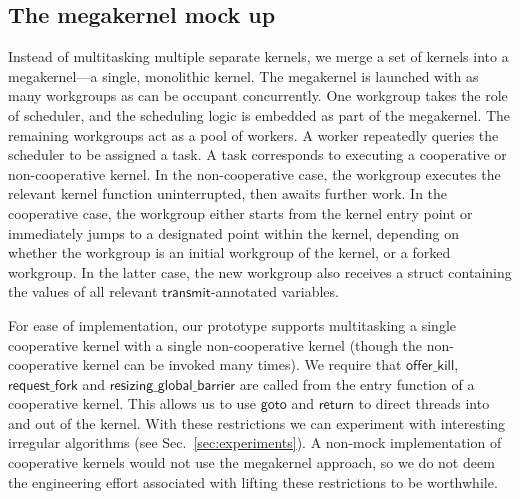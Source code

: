 \documentclass[parskip=half,sigconf,review, anonymous=true, acmcopyrightmode=none]{acmart}
\newcommand{\kernelmerge}{\textsc{KernelMerge}}
\newcommand{\mysec}{Sec.~}
\newcommand{\transmit}{\mathsf{transmit}}
\newcommand{\offerfork}{\mathsf{request\_fork}}
\newcommand{\offerkill}{\mathsf{offer\_kill}}
\newcommand{\resizingglobalbarrier}{\mathsf{resizing\_global\_barrier}}
\newcommand{\keyword}[1]{\mathsf{#1}}
\begin{document}
\subsection{The megakernel mock up}\label{sec:megakernel}

Instead of multitasking multiple separate kernels, we merge a set of
kernels into a megakernel---a single, monolithic kernel.  The
megakernel is launched with as many workgroups as can be occupant
concurrently.  One workgroup takes the role of scheduler, and the
scheduling logic is embedded as part of the megakernel.  The remaining
workgroups act as a pool of workers.  A worker repeatedly queries the
scheduler to be assigned a task.  A task corresponds to executing a
cooperative or non-cooperative kernel.  In the non-cooperative case,
the workgroup executes the relevant kernel function uninterrupted,
then awaits further work.  In the cooperative case, the workgroup
either starts from the kernel entry point or immediately jumps to a
designated point within the kernel, depending on whether the workgroup
is an initial workgroup of the kernel, or a forked workgroup.  In the
latter case, the new workgroup also receives a struct containing the
values of all relevant $\transmit$-annotated variables.

%
For ease of implementation, our prototype supports multitasking a
single cooperative kernel with a single non-cooperative kernel (though
the non-cooperative kernel can be invoked many times).  
We require that $\offerkill$, $\offerfork$ and
$\resizingglobalbarrier$ are called from the entry function of a
cooperative kernel.  This allows us to use $\keyword{goto}$ and
$\keyword{return}$ to direct threads into and out of the kernel.  With
these restrictions we can experiment with interesting irregular
algorithms (see \mysec\ref{sec:experiments}).  A non-mock
implementation of cooperative kernels would not use the megakernel
approach, so we do not deem the engineering effort associated with
lifting these restrictions to be worthwhile.

%
\end{document}
